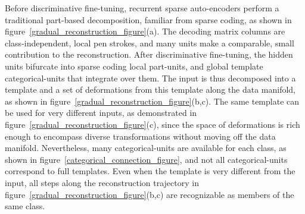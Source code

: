 \documentclass{article} %
\begin{document}
Before discriminative fine-tuning, recurrent sparse auto-encoders perform a traditional part-based decomposition, familiar from sparse coding, as shown in figure~\ref{gradual_reconstruction_figure}(a).  The decoding matrix columns are class-independent, local pen strokes, and many units make a comparable, small contribution to the reconstruction.  After discriminative fine-tuning, the hidden units bifurcate into sparse coding local part-units, and global template categorical-units that integrate %
over them.  The input is thus decomposed into a template and %
a set of deformations from this template along the data manifold, 
as shown in figure~\ref{gradual_reconstruction_figure}(b,c).  The same template can be used for very different inputs, as demonstrated in figure~\ref{gradual_reconstruction_figure}(c), since the space of deformations is rich enough to encompass diverse transformations without moving off the data manifold.  Nevertheless, many categorical-units are available for each class, as shown in figure~\ref{categorical_connection_figure}, and not all categorical-units correspond to full templates.  Even when the template is very different from the input, all steps along the reconstruction trajectory in figure~\ref{gradual_reconstruction_figure}(b,c) are recognizable as members of the same class.

\begin{comment}
\begin{itemize}
\item Histograms of mean decoder column weight, separated by part/classification unit - shows that classification units are net-positive, whereas part units are mean-zero perturbations
\end{itemize}
\end{comment}
\end{document}
